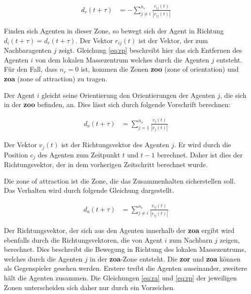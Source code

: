 \begin{subequations}
\begin{align}
d_r(t+\tau) &= - \sum_{j\neq i}^{n_r} \frac{r_{ij}(t)}{|r_{ij}(t)|} \label{eq:rp} 
\end{align}
\end{subequations}

Finden sich Agenten in dieser Zone, so bewegt sich der Agent in Richtung $d_i(t+\tau) = d_r(t+\tau)$.
Der Vektor $r_{ij}(t)$ ist der Vektor, der zum Nachbaragenten $j$ zeigt. Gleichung \ref{eq:rp} beschreibt hier das sich Entfernen des Agenten $i$ von dem lokalen Massezentrum welches durch die Agenten $j$ entsteht. Für den Fall, dass $n_r = 0$ ist, kommen die Zonen \textbf{zoo} (zone of orientation) und \textbf{zoa} (zone of attraction) zu tragen. 

Der Agent $i$ gleicht seine Orientierung den Orientierungen der Agenten $j$, die sich in der \textbf{zoo} befinden, an.
Dies lässt sich durch folgende Vorschrift berechnen:

\begin{subequations}
\begin{align}
d_o(t+\tau) &= \sum_{j=1}^{n_o} \frac{v_{j}(t)}{|v_{j}(t)|} \label{eq:ro} 
\end{align}
\end{subequations}

Der Vektor $v_{j}(t)$ ist der Richtungsvektor des Agenten $j$. Er wird durch die Position $c_j$ des Agenten zum Zeitpunkt $t$ und $t-1$ berechnet. Daher ist dies der Richtungsvektor, der in dem vorherigen Zeitschritt berechnet wurde.

Die zone of attraction ist die Zone, die das Zusammenhalten sicherstellen soll. Das Verhalten wird durch folgende Gleichung dargestellt.

\begin{subequations}
\begin{align}
d_a(t+\tau) &= \sum_{j\neq i}^{n_r} \frac{r_{ij}(t)}{|r_{ij}(t)|} \label{eq:ra}
\end{align}
\end{subequations}

Der Richtungsvektor, der sich aus den Agenten innerhalb der \textbf{zoa} ergibt wird ebenfalls durch die Richtungsvektoren, die von Agent $i$ zum Nachbarn $j$ zeigen, berechnet. Dies beschreibt die Bewegung in Richtung des lokalen Massezentrums, welches durch die Agenten $j$ in der \textbf{zoa}-Zone entsteht. Die \textbf{zor} und \textbf{zoa} können als Gegenspieler gesehen werden. Erstere treibt die Agenten auseinander, zweitere hält die Agenten zusammen. Die Gleichungen \ref{eq:ra} und \ref{eq:rp} der jeweiligen Zonen unterscheiden sich daher nur durch ein Vorzeichen.


